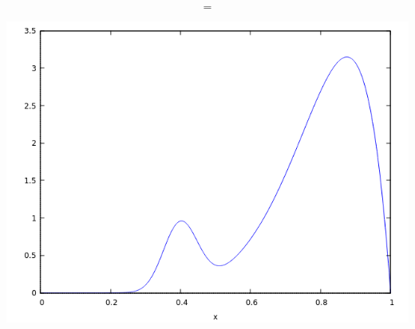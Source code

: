 \documentclass{beamer}
\begin{document}
\begin{frame}[fragile]
\begin{columns}
\end{columns}

$$=$$

\begin{center}\includegraphics[scale=0.2]{images/Beta_mixed_c_0_01.png}\end{center}

\end{frame}


\end{document}
